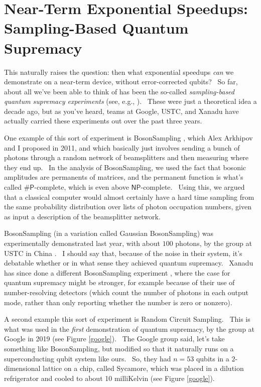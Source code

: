 \documentclass[12pt]{article}
\begin{document}
\section{Near-Term Exponential Speedups: Sampling-Based Quantum Supremacy}

This naturally raises the question: then what exponential speedups \emph{can} we demonstrate on a near-term device, without error-corrected qubits? \ So far, about all we've been able to think of has been the so-called \emph{sampling-based quantum supremacy experiments} (see, e.g., \cite{aark,achen,bjs}). \ These were just a theoretical idea a decade ago, but as you've heard, teams at Google, USTC, and Xanadu have actually carried these experiments out over the past three years.

One example of this sort of experiment is BosonSampling \cite{aark}, which Alex Arkhipov and I proposed in 2011, and which basically just involves sending a bunch of photons through a random network of beamsplitters and then measuring where they end up. \ In the analysis of BosonSampling, we used the fact that bosonic amplitudes are permanents of matrices, and the permanent function is what's called $\mathsf{\#P}$-complete, which is even above $\mathsf{NP}$-complete. \ Using this, we argued that a classical computer would almost certainly have a hard time sampling from the same probability distribution over lists of photon occupation numbers, given as input a description of the beamsplitter network.

BosonSampling (in a variation called Gaussian BosonSampling) was experimentally demonstrated last year, with about $100$ photons, by the group at USTC in China \cite{ustc}. \ I should say that, because of the noise in their system, it's debatable whether or in what sense they achieved quantum supremacy. \ Xanadu has since done a different BosonSampling experiment \cite{xanadu}, where the case for quantum supremacy might be stronger, for example because of their use of number-resolving detectors (which count the number of photons in each output mode, rather than only reporting whether the number is zero or nonzero).

A second example this sort of experiment is Random Circuit Sampling. \ This is what was used in the \emph{first} demonstration of quantum supremacy, by the group at Google in 2019 \cite{arute} (see Figure \ref{google}). \ The Google group said, let's take something like BosonSampling, but modified so that it naturally runs on a superconducting qubit system like ours. \ So, they had $n=53$ qubits in a $2$-dimensional lattice on a chip, called Sycamore, which was placed in a dilution refrigerator and cooled to about 10 milliKelvin (see Figure \ref{google}).
\end{document}
